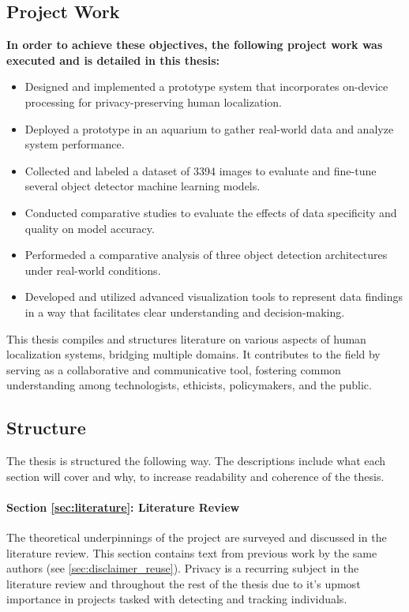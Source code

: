 \subsection{Project Work}
\label{sec:action_points}
\textbf{In order to achieve these objectives, the following project work was executed and is detailed in this thesis:}
\begin{itemize}
    \item Designed and implemented a prototype system that incorporates on-device processing for privacy-preserving human localization.
    \item Deployed a prototype in an aquarium to gather real-world data and analyze system performance.
    \item Collected and labeled a dataset of 3394 images to evaluate and fine-tune several object detector machine learning models.
    \item Conducted comparative studies to evaluate the effects of data specificity and quality on model accuracy.
    \item Performeded a comparative analysis of three object detection architectures under real-world conditions.
    \item Developed and utilized advanced visualization tools to represent data findings in a way that facilitates clear understanding and decision-making.
\end{itemize}

This thesis compiles and structures literature on various aspects of human localization systems, bridging multiple domains. It contributes to the field by serving as a collaborative and communicative tool, fostering common understanding among technologists, ethicists, policymakers, and the public.

\subsection{Structure}
\label{sec:structure}
The thesis is structured the following way. The descriptions include what each section will cover and why, to increase readability and coherence of the thesis.

\paragraph{Section \ref{sec:literature}: Literature Review} 
The theoretical underpinnings of the project are surveyed and discussed in the literature review. This section contains text from previous work by the same authors (see \ref{sec:disclaimer_reuse}). Privacy is a recurring subject in the literature review and throughout the rest of the thesis due to it's upmost importance in projects tasked with detecting and tracking individuals.

